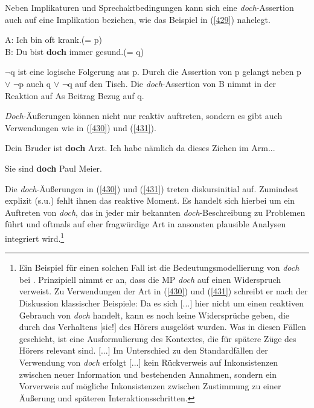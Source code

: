 Neben Implikaturen und Sprechaktbedingungen kann sich eine \textit{doch}-Assertion auch auf eine Implikation  beziehen, wie das Beispiel in (\ref{429}) nahelegt.

\begin{exe}
	\ex\label{429} 
	A: Ich bin oft krank.(= p)\\
	B: Du bist \textbf{doch} immer gesund.(= q)
	\hfill\hbox {\citet[132]{Egg2013}}
\end{exe}
$\neg$q ist eine logische Folgerung aus p. Durch die Assertion von p gelangt neben p $\vee$ $\neg$p auch q $\vee$ $\neg$q auf den Tisch. Die \textit{doch}-Assertion von B nimmt in der Reaktion auf As Beitrag Bezug auf q.

\textit{Doch}-Äußerungen können nicht nur reaktiv auftreten, sondern es gibt auch Verwendungen wie in (\ref{430}) und (\ref{431}).

\begin{exe}
	\ex\label{430} 
	Dein Bruder ist \textbf{doch} Arzt. Ich habe nämlich da dieses Ziehen im Arm... 
	\newline
	\hbox{}\hfill\hbox {\citet[133-134]{Hentschel1986}}
\end{exe}	
\vspace{-0.65cm}
\begin{exe}
	\ex\label{431} 
	Sie sind \textbf{doch} Paul Meier.
	\hfill\hbox {\citet[126]{Egg2013}}
\end{exe}
Die \textit{doch}-Äußerungen in (\ref{430}) und (\ref{431}) treten diskursinitial auf. Zumindest explizit (s.u.) fehlt ihnen das reaktive Moment. Es handelt sich hierbei um ein Auftreten von \textit{doch}, das in jeder mir bekannten \textit{doch}-Beschreibung zu Problemen führt und oftmals auf eher fragwürdige Art in ansonsten plausible Analysen integriert wird.\footnote{Ein Beispiel für einen solchen Fall ist die Bedeutungsmodellierung von \textit{doch} bei \citet[68]{Koenig1997}. Prinzipiell nimmt er an, dass die MP \textit{doch} auf einen Widerspruch verweist. Zu Verwendungen der Art in (\ref{430}) und (\ref{431}) schreibt er nach der Diskussion klassischer Beispiele:  \glqq Da es sich $[$...$]$ hier nicht um einen reaktiven Gebrauch von \textit{doch} handelt, kann es noch keine Widersprüche geben, die durch das Verhaltens $[$sic!$]$ des Hörers ausgelöst wurden. Was in diesen Fällen geschieht, ist eine Ausformulierung des Kontextes, die für spätere Züge des Hö\-rers relevant sind. $[$...$]$ Im Unterschied zu den Standardfällen der Verwendung von \textit{doch} erfolgt $[$...$]$ kein Rückverweis auf Inkonsistenzen zwischen neuer Information und bestehenden Annahmen, sondern ein Vorverweis auf mögliche Inkonsistenzen zwischen Zustimmung zu einer Äußerung und späteren Interaktionsschritten.\grqq{}}

